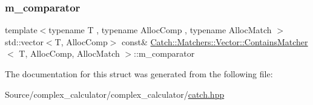 \subsubsection{\texorpdfstring{m\+\_\+comparator}{m\_comparator}}
{\footnotesize\ttfamily template$<$typename T , typename Alloc\+Comp , typename Alloc\+Match $>$ \\
std\+::vector$<$T, Alloc\+Comp$>$ const\& \mbox{\hyperlink{struct_catch_1_1_matchers_1_1_vector_1_1_contains_matcher}{Catch\+::\+Matchers\+::\+Vector\+::\+Contains\+Matcher}}$<$ T, Alloc\+Comp, Alloc\+Match $>$\+::m\+\_\+comparator}



The documentation for this struct was generated from the following file\+:\begin{DoxyCompactItemize}
\item 
Source/complex\+\_\+calculator/complex\+\_\+calculator/\mbox{\hyperlink{catch_8hpp}{catch.\+hpp}}\end{DoxyCompactItemize}
